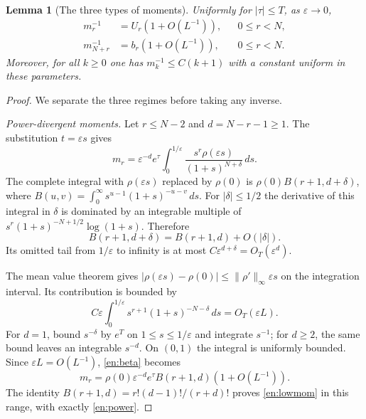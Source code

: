 \documentclass[12pt]{amsart}
\newtheorem{lem}[thm]{Lemma}
\theoremstyle{definition}
\theoremstyle{remark}
\numberwithin{equation}{section}
\theoremstyle{definition}
\begin{document}
\begin{lem}[The three types of moments]\label{en:momentlemma}
Uniformly for $|\tau|\le T$, as $\varepsilon\to0$,
\begin{align}
 m_r^{-1}&=U_r(1+O(L^{-1})),&&0\le r<N,\label{en:lowmom}\\
 m_{N+r}^{-1}&=b_r(1+O(L^{-1})),&&0\le r<N.\label{en:highmom}
\end{align}
Moreover, for all $k\ge0$ one has $m_k^{-1}\le C(k+1)$ with a
constant uniform in these parameters.
\end{lem}
\begin{proof}
We separate the three regimes before taking any inverse.

\emph{Power-divergent moments.}
Let $r\le N-2$ and $d=N-r-1\ge1$. The substitution $t=\varepsilon s$
gives
\begin{equation}\label{en:beta}
 m_r=\varepsilon^{-d}e^\tau
 \int_0^{1/\varepsilon}
 \frac{s^r\rho(\varepsilon s)}{(1+s)^{N+\delta}}\,ds.
\end{equation}
The complete integral with $\rho(\varepsilon s)$ replaced by $\rho(0)$ is
$\rho(0)B(r+1,d+\delta)$, where
$B(u,v)=\int_0^\infty s^{u-1}(1+s)^{-u-v}\,ds$.
For $|\delta|\le1/2$ the derivative of this integral in $\delta$ is
dominated by an integrable multiple of
$s^r(1+s)^{-N+1/2}\log(1+s)$. Therefore
\[
 B(r+1,d+\delta)=B(r+1,d)+O(|\delta|).
\]
Its omitted tail from $1/\varepsilon$ to infinity is at most
$C\varepsilon^{d+\delta}=O_T(\varepsilon^d)$.

The mean value theorem gives
$|\rho(\varepsilon s)-\rho(0)|\le\|\rho'\|_\infty\varepsilon s$
on the integration interval. Its contribution is bounded by
\[
 C\varepsilon\int_0^{1/\varepsilon}
 s^{r+1}(1+s)^{-N-\delta}\,ds=O_T(\varepsilon L).
\]
For $d=1$, bound $s^{-\delta}$ by $e^T$ on $1\le s\le1/\varepsilon$
and integrate $s^{-1}$; for $d\ge2$, the same bound leaves an
integrable $s^{-d}$. On $(0,1)$ the integral is uniformly bounded.
Since $\varepsilon L=O(L^{-1})$, \eqref{en:beta} becomes
\[
 m_r=\rho(0)\varepsilon^{-d}e^\tau
 B(r+1,d)(1+O(L^{-1})).
\]
The identity $B(r+1,d)=r!(d-1)!/(r+d)!$ proves
\eqref{en:lowmom} in this range, with exactly \eqref{en:power}.


\end{proof}
\end{document}
